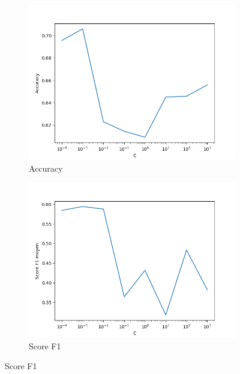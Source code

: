 \documentclass[12pt]{article}
\begin{document}
\begin{figure}[H]
	\centering
    \begin{subfigure}[c]{0.45\textwidth}
        \includegraphics[width=\textwidth]{images/accuracy.png}
    \caption{Accuracy}
    \end{subfigure}
    \begin{subfigure}[c]{0.45\textwidth}
        \includegraphics[width=\textwidth]{images/f1.png}
    \caption{Score F1}
    \end{subfigure}


\end{figure}
\end{document}
